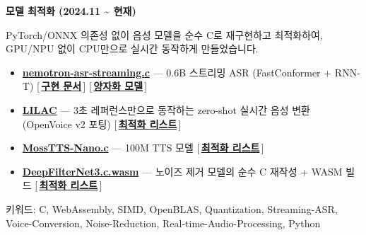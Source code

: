 \documentclass[a4paper]{article}
\newcommand{\ra}{{\symfont →}}
\newcommand{\til}{\textasciitilde{}}
\newcommand{\lnk}[2]{\href{#1}{\textcolor{ink}{\bfseries #2}}}
\newcommand{\disp}{\bfseries}
\newif\ifjusthead
\newif\ifjustsection
\newcommand{\entry}[1]{%
  \par\leftskip=0pt\relax
  \ifjusthead\nobreak\else\ifjustsection\nobreak\else\addvspace{3.4mm}\needspace{9mm}\fi\fi
  \global\justheadfalse\global\justsectionfalse
  \noindent\raisebox{0.62ex}{\tikz\fill[muted] (0,0) rectangle (1.3mm,1.3mm);}\hspace{1.5mm}%
  {\color{ink}\disp\fontsize{9.7}{12.2}\selectfont #1}%
  \par\nobreak\vspace{1.4mm}\nobreak
  \leftskip=5mm\relax}
\newcommand{\keywords}[1]{%
  \par\vspace{1.5mm}%
  {\color{muted}\fontsize{7.4}{9.4}\selectfont #1\par}%
  \par\addvspace{0.3mm}}
\begin{document}
\entry{모델 최적화 (2024.11 \til{} 현재)}
PyTorch/ONNX 의존성 없이 음성 모델을 순수 C로 재구현하고 최적화하여, GPU/NPU 없이 CPU만으로 실시간 동작하게 만들었습니다.\par
\begin{itemize}
  \item \lnk{https://github.com/kdrkdrkdr/nemotron-asr-streaming.c}{nemotron-asr-streaming.c} --- 0.6B 스트리밍 ASR (FastConformer + RNN-T) [\,\lnk{https://github.com/kdrkdrkdr/nemotron-asr-streaming.c/blob/w8a8/MODEL.md}{구현 문서}\,] [\,\lnk{https://huggingface.co/kdrkdrkdr/nemotron-3.5-asr-streaming-0.6b-w8a8}{양자화 모델}\,]
  \item \lnk{https://github.com/kdrkdrkdr/lilac}{LILAC} --- 3초 레퍼런스만으로 동작하는 zero-shot 실시간 음성 변환 (OpenVoice v2 포팅) [\,\lnk{https://github.com/kdrkdrkdr/lilac/blob/main/Optimization.md}{최적화 리스트}\,]
  \item \lnk{https://github.com/kdrkdrkdr/MossTTS-Nano.c}{MossTTS-Nano.c} --- 100M TTS 모델 [\,\lnk{https://github.com/kdrkdrkdr/MossTTS-Nano.c\#optimizations-applied}{최적화 리스트}\,]
  \item \lnk{https://github.com/kdrkdrkdr/DeepFilterNet3.c.wasm}{DeepFilterNet3.c.wasm} --- 노이즈 제거 모델의 순수 C 재작성 + WASM 빌드 [\,\lnk{https://github.com/kdrkdrkdr/DeepFilterNet3.c.wasm/blob/main/OPTIMIZATION.md}{최적화 리스트}\,]
\end{itemize}
\keywords{키워드: C, WebAssembly, SIMD, OpenBLAS, Quantization, Streaming-ASR, Voice-Conversion, Noise-Reduction, Real-time-Audio-Processing, Python}
\end{document}
